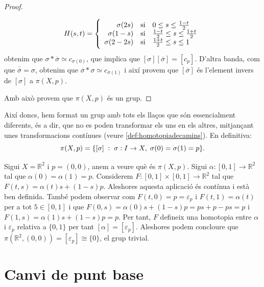 \documentclass[../main.tex]{subfiles}
\begin{document}
\begin{proof}
\begin{enumerate}[(i)]
    \begin{equation}
        \notag
        H(s,t) = \left\{
        \begin{array}{rcl}
            \sigma(2s) & \mathrm{si} & 0\leq s\leq \frac{1-t}{2} \\
            \sigma(1-s) & \mathrm{si} & \frac{1-t}{2}\leq s\leq \frac{1+t}{2} \\
            \sigma(2-2s) & \mathrm{si} & \frac{1+t}{2}\leq s\leq 1
        \end{array}
        \right.
    \end{equation}
    obtenim que $\sigma*\overline{\sigma}\simeq c_{\sigma(0)}$, que implica que $[\sigma][\overline{\sigma}]=[c_p]$. D'altra banda, com que $\overline{\overline{\sigma}} = \sigma$, obtenim que $\overline{\sigma}*\sigma\simeq c_{\sigma(1)}$ i així provem que $[\overline{\sigma}]$ és l'element invers de $[\sigma]$ a $\pi(X,p)$.
\end{enumerate}
Amb això provem que $\pi(X,p)$ és un grup.
\end{proof}

Així doncs, hem format un grup amb tots els llaços que són essencialment diferents, és a dir, que no es poden transformar els uns en els altres, mitjançant unes transformacions contínues (veure \ref{def:homotopiadecamins}). En definitiva:
\begin{equation}
    \notag
    \pi(X,p) = \{[\sigma]\;:\;\sigma:I\rightarrow X,\;\sigma(0)=\sigma(1)=p\}.
\end{equation}

\begin{ej}
\label{ej:grupfonamentalder} Sigui $X = \mathbb{R}^2$ i $p = (0,0)$, anem a veure què és $\pi(X,p)$. Sigui $\alpha:[0,1]\rightarrow \mathbb{R}^2$ tal que $\alpha(0) = \alpha(1) = p$. Considerem $F:[0,1]\times [0,1]\rightarrow \mathbb{R}^2$ tal que $F(t,s) = \alpha(t)s+(1-s)p$. Aleshores aquesta aplicació és contínua i està ben definida. També podem observar com $F(t,0) = p = \varepsilon_p$ i $F(t,1) = \alpha(t)$ per a tot $5\in[0,1]$ i que $F(0,s) = \alpha(0)s+(1-s)p = ps+p-ps = p$ i $F(1,s) = \alpha(1)s+(1-s)p = p$. Per tant, $F$ defineix una homotopia entre $\alpha$ i $\varepsilon_p$ relativa a $\{0,1\}$ per tant $[\alpha] = [\varepsilon_p]$. Aleshores podem concloure que $\pi(\mathbb{R}^2,(0,0)) = [\varepsilon_p]\cong \{0\}$, el grup trivial.
\end{ej}

\section{Canvi de punt base}
\end{document}
